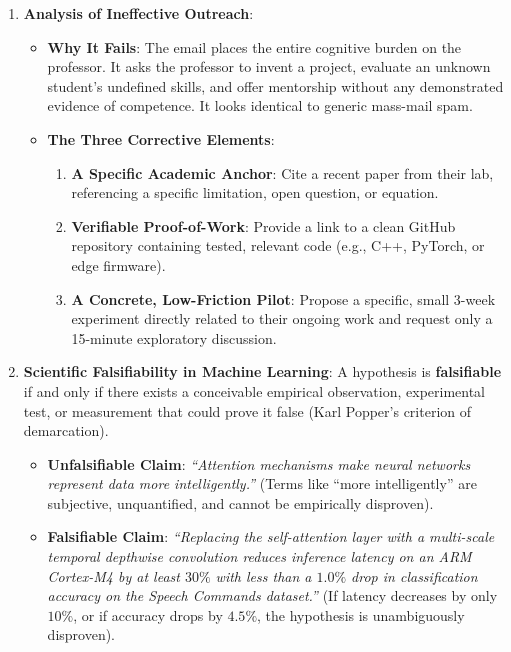 \begin{enumerate}
    \item \textbf{Analysis of Ineffective Outreach}:
    \begin{itemize}
        \item \textbf{Why It Fails}: The email places the entire cognitive burden on the professor. It asks the professor to invent a project, evaluate an unknown student's undefined skills, and offer mentorship without any demonstrated evidence of competence. It looks identical to generic mass-mail spam.
        \item \textbf{The Three Corrective Elements}:
        \begin{enumerate}
            \item \textbf{A Specific Academic Anchor}: Cite a recent paper from their lab, referencing a specific limitation, open question, or equation.
            \item \textbf{Verifiable Proof-of-Work}: Provide a link to a clean GitHub repository containing tested, relevant code (e.g., C++, PyTorch, or edge firmware).
            \item \textbf{A Concrete, Low-Friction Pilot}: Propose a specific, small 3-week experiment directly related to their ongoing work and request only a 15-minute exploratory discussion.
        \end{enumerate}
    \end{itemize}

    \item \textbf{Scientific Falsifiability in Machine Learning}:
    A hypothesis is \textbf{falsifiable} if and only if there exists a conceivable empirical observation, experimental test, or measurement that could prove it false (Karl Popper's criterion of demarcation).
    \begin{itemize}
        \item \textbf{Unfalsifiable Claim}: \emph{``Attention mechanisms make neural networks represent data more intelligently.''} (Terms like ``more intelligently'' are subjective, unquantified, and cannot be empirically disproven).
        \item \textbf{Falsifiable Claim}: \emph{``Replacing the self-attention layer with a multi-scale temporal depthwise convolution reduces inference latency on an ARM Cortex-M4 by at least $30\%$ with less than a $1.0\%$ drop in classification accuracy on the Speech Commands dataset.''} (If latency decreases by only $10\%$, or if accuracy drops by $4.5\%$, the hypothesis is unambiguously disproven).
    \end{itemize}
\end{enumerate}
